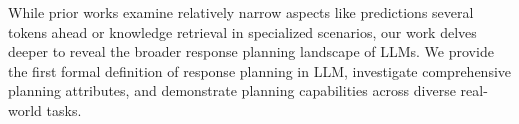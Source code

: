 
While prior works examine relatively narrow aspects like predictions several tokens ahead or knowledge retrieval in specialized scenarios, our work delves deeper to reveal the broader response planning landscape of LLMs. We provide the first formal definition of response planning in LLM, investigate comprehensive planning attributes, and demonstrate planning capabilities across diverse real-world tasks.



